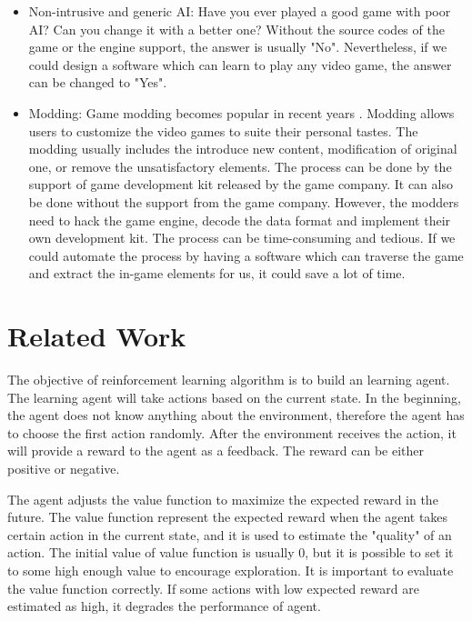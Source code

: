 \begin{itemize}{}
\item Non-intrusive and generic AI:
Have you ever played a good game with poor AI? Can you change it with a better one?
Without the source codes of the game or the engine support, the answer is usually "No".
Nevertheless, if we could design a software which can learn to play any video game, 
the answer can be changed to "Yes".

\item Modding: 
Game modding becomes popular in recent years \cite{Modding}. 
Modding allows users to customize the video games to suite their personal tastes.
The modding usually includes the introduce new content, modification of original one, or remove the unsatisfactory elements.
The process can be done by the support of game development kit released by the game company.
It can also be done without the support from the game company. However, the modders need to hack the game engine,
decode the data format and implement their own development kit. 
The process can be time-consuming and tedious.
If we could automate the process by having a software which can 
traverse the game and extract the in-game elements for us, it could save a lot of time.

\end{itemize}

\chapter{Related Work}
\label{ch:Related}

The objective of reinforcement learning algorithm is to build an learning agent. The learning agent will take
actions based on the current state. In the beginning, the agent does not know anything about 
the environment, therefore the agent has to choose the first action randomly. After the environment
receives the action, it will provide a reward to the agent as a feedback. The reward can be either
positive or negative.

The agent adjusts the value function to maximize the expected reward in the future.
The value function represent the expected reward when the agent takes certain action in the current
state, and it is used to estimate the "quality" of an action. The initial value of value function is 
usually 0, but it is possible to set it to some high enough value to encourage exploration.
It is important to evaluate the value function 
correctly. If some actions with low expected reward are estimated as high, it degrades the
performance of agent.

